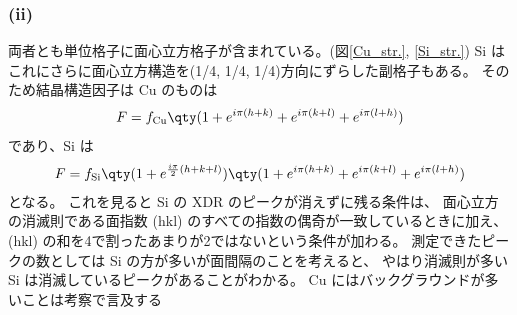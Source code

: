 \documentclass[11pt,dvipdfmx,a4paper]{jsarticle}
\begin{document}
\subsubsection*{(ii)}
両者とも単位格子に面心立方格子が含まれている。(図\ref{Cu_str.}, \ref{Si_str.})
Si はこれにさらに面心立方構造を(1/4, 1/4, 1/4)方向にずらした副格子もある。%
そのため結晶構造因子は Cu のものは
\begin{align}
	F = f_{\text{Cu}}\qty(1+e^{i\pi(h+k)}+e^{i\pi(k+l)}+e^{i\pi(l+h)})
\end{align}
であり、Si は
\begin{align}
	F = f_{\text{Si}}\qty(1+e^{\frac{i\pi}{2}(h+k+l)})\qty(1+e^{i\pi(h+k)}+e^{i\pi(k+l)}+e^{i\pi(l+h)})
\end{align}
となる。
これを見ると Si の XDR のピークが消えずに残る条件は、
面心立方の消滅則である面指数 (hkl) のすべての指数の偶奇が一致しているときに加え、
(hkl) の和を4で割ったあまりが2ではないという条件が加わる。
測定できたピークの数としては Si の方が多いが面間隔のことを考えると、
やはり消滅則が多い Si は消滅しているピークがあることがわかる。%
Cu にはバックグラウンドが多いことは考察で言及する\\ %
\end{document}
